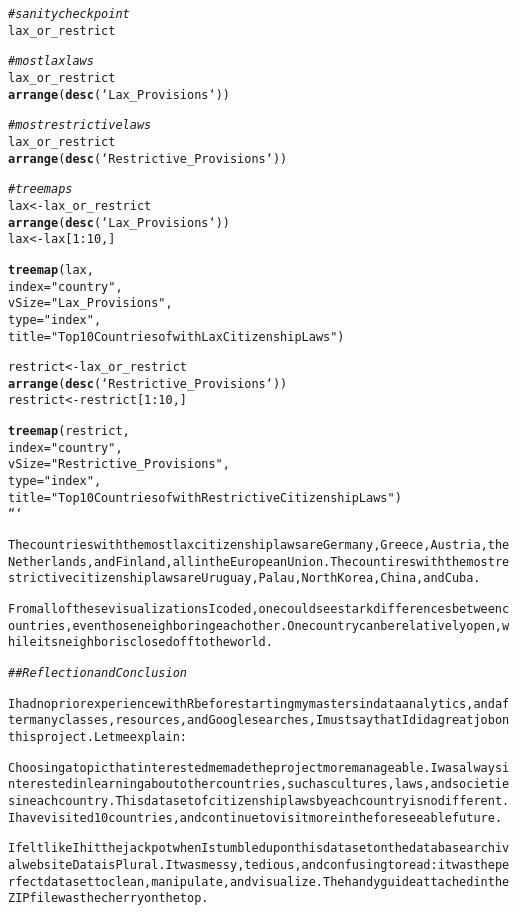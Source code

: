 \documentclass{article}\usepackage[]{graphicx}\usepackage[]{xcolor}
\makeatletter
\newcommand{\hlstr}[1]{\textcolor[rgb]{0.192,0.494,0.8}{#1}}%
\newcommand{\hlcom}[1]{\textcolor[rgb]{0.678,0.584,0.686}{\textit{#1}}}%
\newcommand{\hlkwd}[1]{\textcolor[rgb]{0.737,0.353,0.396}{\textbf{#1}}}%
\newenvironment{kframe}{%
 \def\at@end@of@kframe{}%
 \ifinner\ifhmode%
  \def\at@end@of@kframe{\end{minipage}}%
  \begin{minipage}{\columnwidth}%
 \fi\fi%
 \def\FrameCommand##1{\hskip\@totalleftmargin \hskip-\fboxsep
 \colorbox{shadecolor}{##1}\hskip-\fboxsep
     \hskip-\linewidth \hskip-\@totalleftmargin \hskip\columnwidth}%
 \MakeFramed {\advance\hsize-\width
   \@totalleftmargin\z@ \linewidth\hsize
   \@setminipage}}%
 {\par\unskip\endMakeFramed%
 \at@end@of@kframe}
\newenvironment{knitrout}{}{} %
\makeatother
\begin{document}
\begin{knitrout}
\begin{kframe}
\begin{alltt}
\hlcom{# sanity check point}
lax_or_restrict

\hlcom{# most lax laws}
lax_or_restrict %>%
  \hlkwd{arrange}(\hlkwd{desc}(`Lax_Provisions`))

\hlcom{# most restrictive laws}
lax_or_restrict %>%
  \hlkwd{arrange}(\hlkwd{desc}(`Restrictive_Provisions`))

\hlcom{# tree maps}
lax <- lax_or_restrict %>%
  \hlkwd{arrange}(\hlkwd{desc}(`Lax_Provisions`))
lax <- lax[1:10,]

\hlkwd{treemap}(lax,
            index=\hlstr{"country"},
            vSize=\hlstr{"Lax_Provisions"},
            type = \hlstr{"index"},
            title= \hlstr{"Top 10 Countries of with Lax Citizenship Laws"})

restrict <- lax_or_restrict %>%
  \hlkwd{arrange}(\hlkwd{desc}(`Restrictive_Provisions`))
restrict <- restrict[1:10,]

\hlkwd{treemap}(restrict,
            index=\hlstr{"country"},
            vSize=\hlstr{"Restrictive_Provisions"},
            type = \hlstr{"index"},
            title= \hlstr{"Top 10 Countries of with Restrictive Citizenship Laws"})
```

The countries with the most lax citizenship laws are Germany, Greece, Austria, the Netherlands, and Finland, all in the European Union. The countires with the most restrictive citizenship laws are Uruguay, Palau, North Korea, China, and Cuba. 

From all of these visualizations I coded, one could see stark differences between countries, even those neighboring each other. One country can be relatively open, while its neighbor is closed off to the world. 

\hlcom{## Reflection and Conclusion}

I had no prior experience with R before starting my masters in data analytics, and after many classes, resources, and Google searches, I must say that I did a great job on this project. Let me explain:

Choosing a topic that interested me made the project more manageable. I was always interested in learning about other countries, such as cultures, laws, and societies in each country. This dataset of citizenship laws by each country is no different. I have visited 10 countries, and continue to visit more in the foreseeable future.

I felt like I hit the jackpot when I stumbled upon this dataset on the database archival website Data is Plural. It was messy, tedious, and confusing to read: it was the perfect dataset to clean, manipulate, and visualize. The handy guide attached in the ZIP file was the cherry on the top. 


\end{alltt}
\end{kframe}
\end{knitrout}
\end{document}
